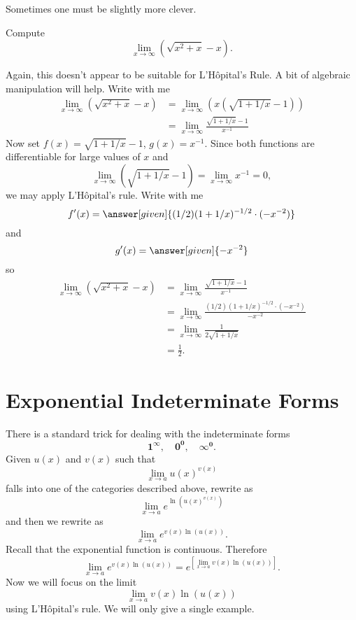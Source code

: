 \documentclass{ximera}
\begin{document}
Sometimes one must be slightly more clever. 

\begin{example}
Compute
\[
\lim_{x\to\infty}\left(\sqrt{x^2+x}-x\right).
\]
\begin{explanation}
Again, this doesn't appear to be suitable for L'H\^{o}pital's Rule. A
bit of algebraic manipulation will help. Write with me
\begin{align*}
\lim_{x\to\infty}\left(\sqrt{x^2+x}-x\right) &= \lim_{x\to\infty}\left(x\left(\sqrt{1+1/x}-1\right)\right)\\
&=\lim_{x\to\infty}\frac{\sqrt{1+1/x}-1}{x^{-1}}
\end{align*}
Now set $f(x) = \sqrt{1+1/x}-1$, $g(x) = x^{-1}$. Since both
  functions are differentiable for large values of $x$ and 
\[
\lim_{x\to\infty} (\sqrt{1+1/x}-1) = \lim_{x\to\infty}x^{-1} = 0, 
\]
we may apply L'H\^{o}pital's rule. Write with me
\[
f'(x) = \answer[given]{(1/2)(1+1/x)^{-1/2}\cdot(-x^{-2})}
\]
and
\[
g'(x) = \answer[given]{-x^{-2}}
\]
so
\begin{align*}
\lim_{x\to\infty}\left(\sqrt{x^2+x}-x\right) &= \lim_{x\to\infty}\frac{\sqrt{1+1/x}-1}{x^{-1}} \\
&= \lim_{x\to\infty}\frac{(1/2)(1+1/x)^{-1/2}\cdot(-x^{-2})}{-x^{-2}} \\
&= \lim_{x\to\infty} \frac{1}{2\sqrt{1+1/x}}\\
&= \frac{1}{2}.
\end{align*}
\end{explanation}
\end{example}

\section{Exponential Indeterminate Forms}

There is a standard trick for dealing with the indeterminate forms
\[
\ensuremath{\boldsymbol{1^\infty}},\quad \ensuremath{\boldsymbol{0^0}},\quad \ensuremath{\boldsymbol{\infty^0}}.
\]
Given $u(x)$ and $v(x)$ such that
\[
\lim_{x\to a}u(x)^{v(x)}
\]
falls into one of the categories described above, rewrite as
\[
    \lim_{x\to a}e^{\ln\left(u(x)^{v(x)}\right)}
\]
and then we rewrite as
\[
    \lim_{x\to a}e^{v(x)\ln{(u(x))}}.
\]
 Recall that the exponential function is continuous. Therefore
\[
 \lim_{x\to a}e^{v(x)\ln{(u(x))}}=e^{\left[\lim_{x\to a} v(x)\ln(u(x))\right]}. 
\]
Now we will focus on the limit
\[
\lim_{x\to a} v(x)\ln(u(x))
\]
using L'H\^{o}pital's rule. We will only give a single example.
\end{document}
